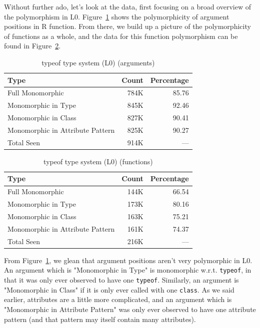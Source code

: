 \documentclass[acmsmall,10pt,review,anonymous]{acmart}\settopmatter{printfolios=true,printccs=false,printacmref=false}
\newcommand{\code}[1]{\lstinline|#1|\xspace}
\begin{document}
Without further ado, let's look at the data, first focusing on a broad overview of the polymorphism in L0.
Figure~\ref{fig:L1argcounts} shows the polymorphicity of argument positions in R function.
From there, we build up a picture of the polymorphicity of functions as a whole, and the data for this function polymorphism can be found in Figure~\ref{fig:L1funcounts}.

\begin{table}[ht]
\label{fig:L1argcounts}
\centering
\begin{tabular}{lrr}
  \hline
Type & Count & Percentage \\ 
  \hline
Full Monomorphic & 784K & 85.76 \\ 
  Monomorphic in Type & 845K & 92.46 \\ 
  Monomorphic in Class & 827K & 90.41 \\ 
  Monomorphic in Attribute Pattern & 825K & 90.27 \\ 
  Total Seen & 914K & --- \\ 
   \hline
\end{tabular}
\caption{typeof type system (L0) (arguments)}
\end{table}
\begin{table}[ht]
\label{fig:L1funcounts}
\centering
\begin{tabular}{lrr}
  \hline
Type & Count & Percentage \\ 
  \hline
Full Monomorphic & 144K & 66.54 \\ 
  Monomorphic in Type & 173K & 80.16 \\ 
  Monomorphic in Class & 163K & 75.21 \\ 
  Monomorphic in Attribute Pattern & 161K & 74.37 \\ 
  Total Seen & 216K & --- \\ 
   \hline
\end{tabular}
\caption{typeof type system (L0) (functions)}
\end{table}

From Figure~\ref{fig:L1argcounts}, we glean that argument positions aren't very polymorphic in L0.
An argument which is "Monomorphic in Type" is monomorphic w.r.t. \code{typeof}, in that it was only ever observed to have one \code{typeof}.
Similarly, an argument is "Monomorphic in Class" if it is only ever called with one {\tt class}.
As we said earlier, attributes are a little more complicated, and an argument which is "Monomorphic in Attribute Pattern" was only ever observed to have one attribute pattern (and that pattern may itself contain many attributes).
\end{document}
